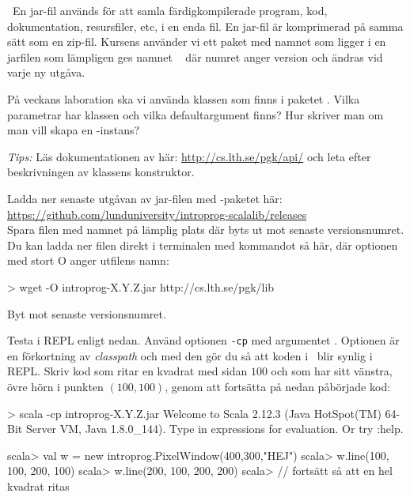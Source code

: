 \QUESTEND




\QUESTBEGIN

\Task \what~En jar-fil används för att samla färdigkompilerade program, kod, dokumentation, resursfiler, etc, i en enda fil. En jar-fil är komprimerad på samma sätt som en zip-fil. Kursens använder vi ett paket med namnet  som ligger i en jarfilen som lämpligen ges namnet \LibJar~ där numret anger version och ändras vid varje ny utgåva.

\Subtask På veckans laboration ska vi använda klassen  som finns i paketet . Vilka parametrar har klassen  och vilka defaultargument finns? Hur skriver man om man vill skapa en -instans?

\emph{Tips:}  Läs dokumentationen av  här: \url{http://cs.lth.se/pgk/api/}
och leta efter beskrivningen av klassens konstruktor.

\Subtask Ladda ner senaste utgåvan av jar-filen med -paketet här:
\\\url{https://github.com/lunduniversity/introprog-scalalib/releases}
\\ Spara filen med namnet   på lämplig plats där  byts ut mot senaste versionsnumret. Du kan ladda ner filen direkt i terminalen med kommandot  så här, där optionen  med stort O anger utfilens namn:
\begin{REPLnonum}
> wget -O introprog-X.Y.Z.jar http://cs.lth.se/pgk/lib
\end{REPLnonum}
Byt  mot senaste versionsnumret.

\Subtask Testa  i REPL enligt nedan. Använd optionen \texttt{-cp} med argumentet \LibJar. Optionen  är en förkortning av \emph{classpath} och med den gör du så att koden i \LibJar~blir synlig i REPL.  Skriv kod som ritar en kvadrat med sidan $100$ och som har sitt vänstra, övre hörn i punkten $(100,100)$, genom att fortsätta på nedan påbörjade kod:

\begin{REPL}
> scala -cp introprog-X.Y.Z.jar
Welcome to Scala 2.12.3 (Java HotSpot(TM) 64-Bit Server VM, Java 1.8.0_144).
Type in expressions for evaluation. Or try :help.

scala> val w = new introprog.PixelWindow(400,300,"HEJ")
scala> w.line(100, 100, 200, 100)
scala> w.line(200, 100, 200, 200)
scala> // fortsätt så att en hel kvadrat ritas
\end{REPL}

